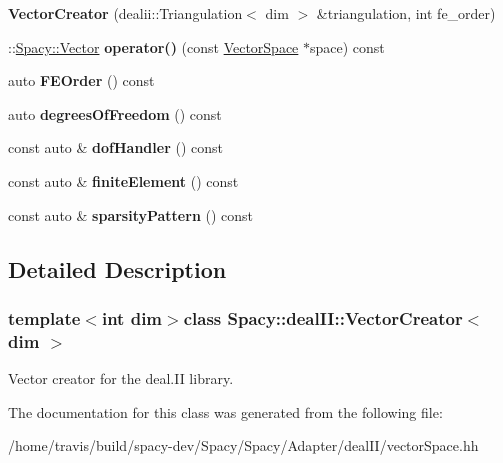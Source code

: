 \begin{DoxyCompactItemize}
\item 
\hypertarget{classSpacy_1_1dealII_1_1VectorCreator_a5afc306745f86ae52ad33a5c83884935}{{\bfseries \-Vector\-Creator} (dealii\-::\-Triangulation$<$ dim $>$ \&triangulation, int fe\-\_\-order)}\label{classSpacy_1_1dealII_1_1VectorCreator_a5afc306745f86ae52ad33a5c83884935}

\item 
\hypertarget{classSpacy_1_1dealII_1_1VectorCreator_ab4ae05c4dd528e1f4d45231e32021437}{\-::\hyperlink{classSpacy_1_1Vector}{\-Spacy\-::\-Vector} {\bfseries operator()} (const \hyperlink{classSpacy_1_1VectorSpace}{\-Vector\-Space} $\ast$space) const }\label{classSpacy_1_1dealII_1_1VectorCreator_ab4ae05c4dd528e1f4d45231e32021437}

\item 
\hypertarget{classSpacy_1_1dealII_1_1VectorCreator_a61e5fe6c73cefe05d16140608542cbaa}{auto {\bfseries \-F\-E\-Order} () const }\label{classSpacy_1_1dealII_1_1VectorCreator_a61e5fe6c73cefe05d16140608542cbaa}

\item 
\hypertarget{classSpacy_1_1dealII_1_1VectorCreator_affb824748540374f0fbfa4d3467d1255}{auto {\bfseries degrees\-Of\-Freedom} () const }\label{classSpacy_1_1dealII_1_1VectorCreator_affb824748540374f0fbfa4d3467d1255}

\item 
\hypertarget{classSpacy_1_1dealII_1_1VectorCreator_ae048100414798458ac093953de6475ac}{const auto \& {\bfseries dof\-Handler} () const }\label{classSpacy_1_1dealII_1_1VectorCreator_ae048100414798458ac093953de6475ac}

\item 
\hypertarget{classSpacy_1_1dealII_1_1VectorCreator_a48104b12fa317e7a29fd531cca8a8b4f}{const auto \& {\bfseries finite\-Element} () const }\label{classSpacy_1_1dealII_1_1VectorCreator_a48104b12fa317e7a29fd531cca8a8b4f}

\item 
\hypertarget{classSpacy_1_1dealII_1_1VectorCreator_a08c118dd385713f3c58175947a9ac7b3}{const auto \& {\bfseries sparsity\-Pattern} () const }\label{classSpacy_1_1dealII_1_1VectorCreator_a08c118dd385713f3c58175947a9ac7b3}

\end{DoxyCompactItemize}


\subsection{\-Detailed \-Description}
\subsubsection*{template$<$int dim$>$class Spacy\-::deal\-I\-I\-::\-Vector\-Creator$<$ dim $>$}

\-Vector creator for the deal.\-I\-I library. 

\-The documentation for this class was generated from the following file\-:\begin{DoxyCompactItemize}
\item 
/home/travis/build/spacy-\/dev/\-Spacy/\-Spacy/\-Adapter/deal\-I\-I/vector\-Space.\-hh\end{DoxyCompactItemize}
